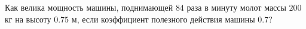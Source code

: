 Как велика мощность машины, поднимающей $84$ раза в минуту молот массы 
$200$ кг на высоту $0.75$ м, если коэффициент полезного действия машины
$0.7$?
